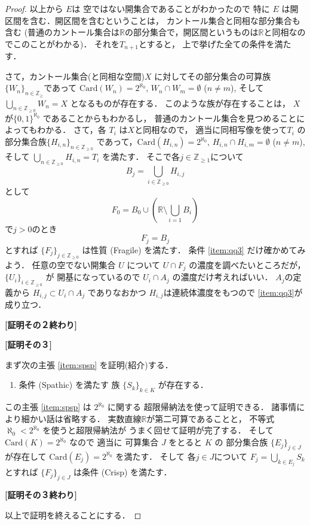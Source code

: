 \documentclass[leqno, a4paper, 12pt]{jsarticle}
\theoremstyle{definition}
\newcommand{\zz}{\mathbb{Z}}
\newcommand{\rr}{\mathbb{R}}
\newcommand{\card}{\mathrm{Card}}
\newcommand{\myco}{2^{\aleph_{0}}}
\newcommand{\mysei}{\textup{(Crisp)}}
\newcommand{\mysq}{\textup{(Fragile)}}
\newcommand{\mysw}{\textup{(Spathic)}}
\begin{document}
\begin{proof}
以上から
$E$は
空ではない開集合であることがわかったので
特に
$E$
は開区間を含む．開区間を含むということは，
カントール集合と同相な部分集合も含む
(普通のカントール集合は$\rr$の部分集合で，開区間というものは$\rr$と同相なのでこのことがわかる)．
それを$T_{n+1}$とすると，
上で挙げた全ての条件を満たす．

さて，カントール集合(と同相な空間)$X$
に対してその部分集合の可算族
$\{W_{n}\}_{n\in \zz_{\ge }}$であって
$\card(W_{n})=\myco$, 
$W_{n}\cap W_{m}=\emptyset$ ($n\neq m$), 
そして
$\bigcup_{n\in \zz_{\ge 0}}W_{n}=X$
となるものが存在する．
このような族が存在することは，
$X$が$\{0, 1\}^{\aleph_{0}}$
であることからもわかるし，
普通のカントール集合を見つめることによってもわかる．
さて，各
$T_{i}$
は$X$と同相なので，
適当に同相写像を使って$T_{i}$
の部分集合族$\{H_{i, n}\}_{n\in\zz_{\ge 0}}$
であって，$\card(H_{i, n})=\myco$, 
$H_{i, n}\cap H_{i, m}=\emptyset$ ($n\neq m$), 
そして
$\bigcup_{n\in \zz_{\ge 0}}H_{i, n}=T_{i}$
を満たす．
そこで各$j\in \zz_{\ge 1}$について
\[
B_{j}=\bigcup_{i\in \zz_{\ge 0}}H_{i, j}
\]
として
\[
F_{0}=B_{0}\cup \left(\rr\setminus \bigcup_{i=1}B_{i}\right)
\]
で$j>0$のとき
\[
F_{j}=B_{j}
\]
とすれば
$\{F_{j}\}_{j\in \zz_{\ge 0}}$
は性質
\mysq
を満たす．
条件
\ref{item:qq3}
だけ確かめてみよう．
任意の空でない開集合
$U$
について
$U\cap F_{j}$
の濃度を調べたいところだが，
$\{U_{i}\}_{i\in \zz_{\ge 0}}$
が
開基になっているので
$U_{i}\cap A_{j}$
の濃度だけ考えればいい．
$A_{j}$の定義から
$H_{i, j}\subset U_{i}\cap A_{j}$
でありなおかつ
$H_{i, j}$は連続体濃度をもつので
\ref{item:qq3}が成り立つ．

\textbf{[証明その２終わり]}

\textbf{[証明その３]}


まず次の主張
\ref{item:spsp}
を証明(紹介)する．
\begin{enumerate}[label=\textup{($\spadesuit$)}]
\item\label{item:spsp}
条件
\mysw
を満たす
族
$\{S_{k}\}_{k\in K}$
が存在する．

\end{enumerate}

この主張
\ref{item:spsp}
は
$\myco$
に関する
超限帰納法を使って証明できる．
諸事情により細かい話は省略する．
実数直線$\rr$が第二可算であることと，
不等式$\aleph_{0}<\myco$
を使うと超限帰納法が
うまく回せて証明が完了する．
そして
$\card(K)=\myco$
なので
適当に
可算集合
$J$
をとると
$K$
の
部分集合族
$\{E_{j}\}_{j\in J}$
が存在して 
$\card(E_{j})=\myco$
を満たす．
そして
各$j\in J$について
$F_{j}=\bigcup_{k\in E_{j}}S_{k}$
とすれば
$\{F_{j}\}_{j\in J}$
は条件
\mysei
を満たす．

\textbf{[証明その３終わり]}

以上で証明を終えることにする．
\end{proof}
\end{document}
